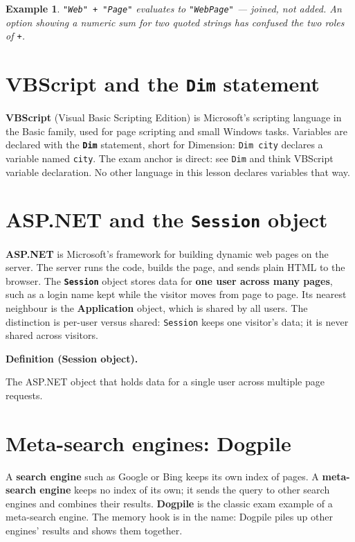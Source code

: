 \documentclass[11pt]{article}
\newtheorem{example}{Example}[section]
\newenvironment{definitionbox}[1]{%
  \par\noindent\textbf{Definition (#1).}\ \itshape
}{\par\vspace{0.3em}}
\begin{document}
\begin{example}
\texttt{"Web" + "Page"} evaluates to \texttt{"WebPage"} --- joined, not added. An option showing a numeric sum for two quoted strings has confused the two roles of \texttt{+}.
\end{example}

\section{VBScript and the \texttt{Dim} statement}
\textbf{VBScript} (Visual Basic Scripting Edition) is Microsoft's scripting language in the Basic family, used for page scripting and small Windows tasks. Variables are declared with the \textbf{\texttt{Dim}} statement, short for Dimension: \texttt{Dim city} declares a variable named \texttt{city}. The exam anchor is direct: see \texttt{Dim} and think VBScript variable declaration. No other language in this lesson declares variables that way.

\section{ASP.NET and the \texttt{Session} object}
\textbf{ASP.NET} is Microsoft's framework for building dynamic web pages on the server. The server runs the code, builds the page, and sends plain HTML to the browser. The \textbf{\texttt{Session}} object stores data for \textbf{one user across many pages}, such as a login name kept while the visitor moves from page to page. Its nearest neighbour is the \textbf{Application} object, which is shared by all users. The distinction is per-user versus shared: \texttt{Session} keeps one visitor's data; it is never shared across visitors.

\begin{definitionbox}{Session object}
The ASP.NET object that holds data for a single user across multiple page requests.
\end{definitionbox}

\section{Meta-search engines: Dogpile}
A \textbf{search engine} such as Google or Bing keeps its own index of pages. A \textbf{meta-search engine} keeps no index of its own; it sends the query to other search engines and combines their results. \textbf{Dogpile} is the classic exam example of a meta-search engine. The memory hook is in the name: Dogpile piles up other engines' results and shows them together.
\end{document}
